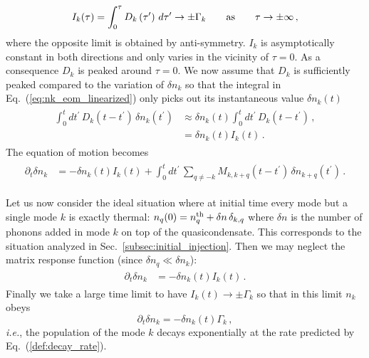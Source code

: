 \documentclass[aps,prd,notitlepage,amsfonts,amssymb,amsmath,nofootinbib,superscriptaddress,longbibliography]{revtex4-2}
\begin{document}
\begin{appendices}
\begin{equation}
   I_{k}(\tau) = \int_{0}^{\tau} D_{k}\left(\tau^{\prime}\right) \, d\tau^{\prime} \to  \pm \Gamma_{k} \qquad {\rm as} \qquad \tau \to \pm \infty \, ,
   \label{eq:Ik_asymptotic}
\end{equation}
where the opposite limit is obtained by anti-symmetry. $I_{k}$ is asymptotically constant in both directions and only varies in the vicinity of $\tau= 0$. As a consequence $D_k$ is peaked around $\tau =0$. We now assume that $D_k$ is sufficiently peaked compared to the variation of $\delta n_k$ so that the integral in Eq.~(\ref{eq:nk_eom_linearized}) only picks out its instantaneous value $\delta n_k(t)$
\begin{align}
\begin{split}
\int_{0}^{t} dt^{\prime} \, D_{k}\left(t-t^{\prime}\right) \, \delta n_{k}\left(t^{\prime}\right) & \approx \delta n_{k}\left(t \right) \int_{0}^{t} dt^{\prime} \, D_{k}\left(t-t^{\prime}\right) \, , \\
& = \delta n_{k}\left(t \right) I_{k}(t) \, .
\end{split}
\end{align}
The equation of motion becomes
\begin{align}
\begin{split}
\partial_{t} \delta n_{k} & = - \delta n_{k}\left(t \right) I_{k}(t) + \int_{0}^{t} dt^{\prime} \, \sum_{q \neq - k } M_{k,k+q}\left(t-t^{\prime}\right) \, \delta n_{k+q}\left(t^{\prime}\right)  \,.
\label{eq:nk_eom_linearized_diagonal_markovian}
\end{split}
\end{align}

Let us now consider the ideal situation where at initial time every mode but a single mode $k$ is exactly thermal: $n_q(0) = n^{\rm th}_q + \delta n \, \delta_{k,q}$ where $\delta n $ is the number of phonons added in mode $k$ on top of the quasicondensate. This corresponds to the situation analyzed in Sec.~\ref{subsec:initial_injection}. Then we may neglect the matrix response function (since $\delta n_q \ll \delta n_k$):
\begin{align}
\begin{split}
\partial_{t} \delta n_{k} & = - \delta n_{k}\left(t \right) I_{k}(t)  \,.
\label{eq:nk_eom_linearized_only_diagonal}
\end{split}
\end{align}
Finally we take a large time limit to have $I_{k}(t) \to  \pm \Gamma_{k}$ so that in this limit $n_k$ obeys 
\begin{equation}
    \partial_{t} \delta n_{k} = - \delta n_{k}\left(t \right) \Gamma_{k} \, ,
    \label{eq:nk_eom_exponential}
\end{equation}
{\it i.e.}, the population of the mode $k$ decays exponentially at the rate predicted by Eq.~(\ref{def:decay_rate}).





\end{appendices}
\end{document}
